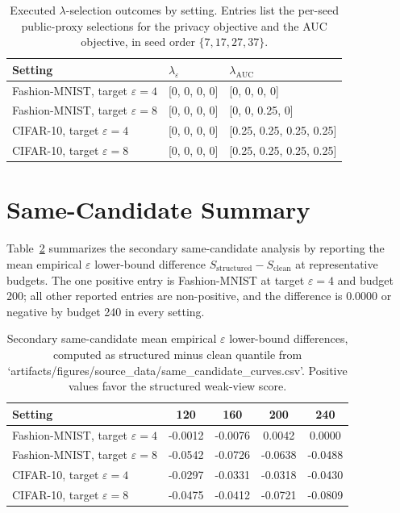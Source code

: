 \documentclass{article}
\newcommand{\eps}{\varepsilon}
\begin{document}
\begin{table}[t]
\caption{Executed \(\lambda\)-selection outcomes by setting. Entries list the per-seed public-proxy selections for the privacy objective and the AUC objective, in seed order \(\{7,17,27,37\}\).}
\label{tab:lambda-appendix}
\centering
\small
\begin{tabular}{lll}
\toprule
Setting & \(\lambda_{\eps}\) & \(\lambda_{\mathrm{AUC}}\) \\
\midrule
Fashion-MNIST, target \(\eps=4\) & [0, 0, 0, 0] & [0, 0, 0, 0] \\
Fashion-MNIST, target \(\eps=8\) & [0, 0, 0, 0] & [0, 0, 0.25, 0] \\
CIFAR-10, target \(\eps=4\) & [0, 0, 0, 0] & [0.25, 0.25, 0.25, 0.25] \\
CIFAR-10, target \(\eps=8\) & [0, 0, 0, 0] & [0.25, 0.25, 0.25, 0.25] \\
\bottomrule
\end{tabular}
\end{table}

\section{Same-Candidate Summary}
\label{app:same-candidate}

Table~\ref{tab:same-candidate-diff} summarizes the secondary same-candidate analysis by reporting the mean empirical \(\eps\) lower-bound difference \(S_{\mathrm{structured}}-S_{\mathrm{clean}}\) at representative budgets. The one positive entry is Fashion-MNIST at target \(\eps=4\) and budget 200; all other reported entries are non-positive, and the difference is 0.0000 or negative by budget 240 in every setting.

\begin{table}[t]
\caption{Secondary same-candidate mean empirical \(\eps\) lower-bound differences, computed as structured minus clean quantile from `artifacts/figures/source\_data/same\_candidate\_curves.csv'. Positive values favor the structured weak-view score.}
\label{tab:same-candidate-diff}
\centering
\small
\begin{tabular}{lcccc}
\toprule
Setting & 120 & 160 & 200 & 240 \\
\midrule
Fashion-MNIST, target \(\eps=4\) & -0.0012 & -0.0076 & 0.0042 & 0.0000 \\
Fashion-MNIST, target \(\eps=8\) & -0.0542 & -0.0726 & -0.0638 & -0.0488 \\
CIFAR-10, target \(\eps=4\) & -0.0297 & -0.0331 & -0.0318 & -0.0430 \\
CIFAR-10, target \(\eps=8\) & -0.0475 & -0.0412 & -0.0721 & -0.0809 \\
\bottomrule
\end{tabular}
\end{table}



\end{document}
